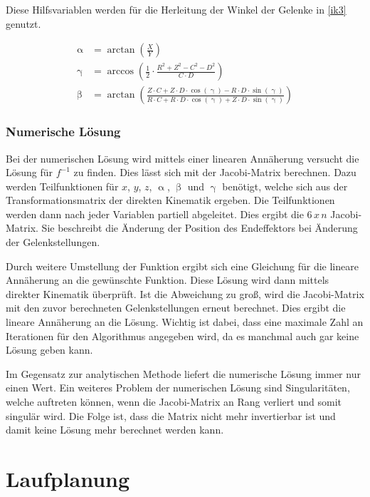 Diese Hilfsvariablen werden für die Herleitung der Winkel der Gelenke in \autoref{ik3} genutzt.
  
\begin{equation}
  \begin{aligned}
    \upalpha & = \arctan{\left(\frac{X}{Y}\right)} \\[1em]
    \upgamma & = \arccos{\left(\frac{1}{2} \cdot \frac{R^2 + Z^2 - C^2 - D^2}{C \cdot D}\right)} \\[1em]
    \upbeta & = \arctan{\left(\frac{Z \cdot C + Z \cdot D \cdot \cos(\upgamma) - R \cdot D \cdot \sin(\upgamma)}{R \cdot C + R \cdot D \cdot \cos(\upgamma) + Z \cdot D \cdot \sin(\upgamma)}\right)}
  \end{aligned}
  \label{ik3}
\end{equation}

\subsubsection{Numerische Lösung}

Bei der numerischen Lösung wird mittels einer linearen Annäherung versucht die Lösung für $f^{-1}$ zu finden. Dies lässt sich mit der Jacobi-Matrix berechnen. Dazu werden Teilfunktionen für $x$, $y$, $z$, $\upalpha$, $\upbeta$ und $\upgamma$ benötigt, welche sich aus der Transformationsmatrix der direkten Kinematik ergeben. Die Teilfunktionen werden dann nach jeder Variablen partiell abgeleitet. Dies ergibt die $6\,x\,n$ Jacobi-Matrix. Sie beschreibt die Änderung der Position des Endeffektors bei Änderung der Gelenkstellungen.

Durch weitere Umstellung der Funktion ergibt sich eine Gleichung für die lineare Annäherung an die gewünschte Funktion. Diese Lösung wird dann mittels direkter Kinematik überprüft. Ist die Abweichung zu groß, wird die Jacobi-Matrix mit den zuvor berechneten Gelenkstellungen erneut berechnet. Dies ergibt die lineare Annäherung an die Lösung. Wichtig ist dabei, dass eine maximale Zahl an Iterationen für den Algorithmus angegeben wird, da es manchmal auch gar keine Lösung geben kann.

Im Gegensatz zur analytischen Methode liefert die numerische Lösung immer nur einen Wert. Ein weiteres Problem der numerischen Lösung sind Singularitäten, welche auftreten können, wenn die Jacobi-Matrix an Rang verliert und somit singulär wird. Die Folge ist, dass die Matrix nicht mehr invertierbar ist und damit keine Lösung mehr berechnet werden kann.

\section{Laufplanung}

